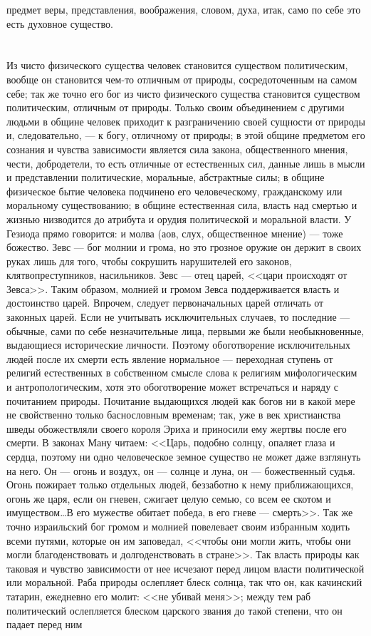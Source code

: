 \documentclass[12pt]{article}
\begin{document}
предмет веры, представления, воображения, словом, духа, итак, само по себе это есть духовное существо.


\section{}

Из чисто физического существа человек становится существом политическим, вообще он становится чем-то отличным от природы, сосредоточенным на самом себе; так же точно его бог из чисто физического существа становится существом политическим, отличным от природы. Только своим объединением с другими людьми в общине человек приходит к разграничению своей сущности от природы и, следовательно, --- к богу, отличному от природы; в этой общине предметом его сознания и чувства зависимости является сила закона, общественного мнения, чести, добродетели, то есть отличные от естественных сил, данные лишь в мысли и представлении политические, моральные, абстрактные силы; в общине физическое бытие человека подчинено его человеческому, гражданскому или моральному существованию; в общине естественная сила, власть над смертью и жизнью низводится до атрибута и орудия политической и моральной власти. У Гезиода прямо говорится: и молва (аов, слух, общественное мнение) --- тоже божество. Зевс --- бог молнии и грома, но это грозное оружие он держит в своих руках лишь для того, чтобы сокрушить нарушителей его законов, клятвопреступников, насильников. Зевс --- отец царей, <<цари происходят от Зевса>>. Таким образом, молнией и громом Зевса поддерживается власть и достоинство царей. Впрочем, следует первоначальных царей отличать от законных царей. Если не учитывать исключительных случаев, то последние --- обычные, сами по себе незначительные лица, первыми же были необыкновенные, выдающиеся исторические личности. Поэтому обоготворение исключительных людей после их смерти есть явление нормальное --- переходная ступень от религий естественных в собственном смысле слова к религиям мифологическим и антропологическим, хотя это обоготворение может встречаться и наряду с почитанием природы. Почитание выдающихся людей как богов ни в какой мере не свойственно только баснословным временам; так, уже в век христианства шведы обожествляли своего короля Эриха и приносили ему жертвы после его смерти. В законах Ману читаем: <<Царь, подобно солнцу, опаляет глаза и сердца, поэтому ни одно человеческое земное существо не может даже взглянуть на него. Он --- огонь и воздух, он --- солнце и луна, он --- божественный судья. Огонь пожирает только отдельных людей, беззаботно к нему приближающихся, огонь же царя, если он гневен, сжигает целую семью, со всем ее скотом и имуществом\dots В его мужестве обитает победа, в его гневе --- смерть>>. Так же точно израильский бог громом и молнией повелевает своим избранным ходить всеми путями, которые он им заповедал, <<чтобы они могли жить, чтобы они могли благоденствовать и долгоденствовать в стране>>. Так власть природы как таковая и чувство зависимости от нее исчезают перед лицом власти политической или моральной. Раба природы ослепляет блеск солнца, так что он, как качинский татарин, ежедневно его молит: <<не убивай меня>>; между тем раб политический ослепляется блеском царского звания до такой степени, что он падает перед ним 
\end{document}
